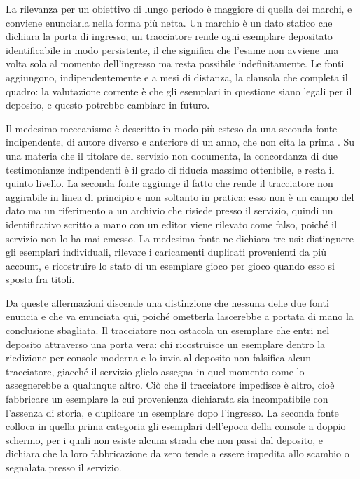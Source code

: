 La rilevanza per un obiettivo di lungo periodo è maggiore di quella dei marchi, e conviene enunciarla nella forma più netta. Un marchio è un dato statico che dichiara la porta di ingresso; un tracciatore rende ogni esemplare depositato identificabile in modo persistente, il che significa che l'esame non avviene una volta sola al momento dell'ingresso ma resta possibile indefinitamente. Le fonti aggiungono, indipendentemente e a mesi di distanza, la clausola che completa il quadro: la valutazione corrente è che gli esemplari in questione siano legali per il deposito, e questo potrebbe cambiare in futuro.

Il medesimo meccanismo è descritto in modo più esteso da una seconda fonte indipendente, di autore diverso e anteriore di un anno, che non cita la prima \cite{amiibodoctor-generazione}. Su una materia che il titolare del servizio non documenta, la concordanza di due testimonianze indipendenti è il grado di fiducia massimo ottenibile, e resta il quinto livello. La seconda fonte aggiunge il fatto che rende il tracciatore non aggirabile in linea di principio e non soltanto in pratica: esso non è un campo del dato ma un riferimento a un archivio che risiede presso il servizio, quindi un identificativo scritto a mano con un editor viene rilevato come falso, poiché il servizio non lo ha mai emesso. La medesima fonte ne dichiara tre usi: distinguere gli esemplari individuali, rilevare i caricamenti duplicati provenienti da più account, e ricostruire lo stato di un esemplare gioco per gioco quando esso si sposta fra titoli.

Da queste affermazioni discende una distinzione che nessuna delle due fonti enuncia e che va enunciata qui, poiché ometterla lascerebbe a portata di mano la conclusione sbagliata. Il tracciatore non ostacola un esemplare che entri nel deposito attraverso una porta vera: chi ricostruisce un esemplare dentro la riedizione per console moderna e lo invia al deposito non falsifica alcun tracciatore, giacché il servizio glielo assegna in quel momento come lo assegnerebbe a qualunque altro. Ciò che il tracciatore impedisce è altro, cioè fabbricare un esemplare la cui provenienza dichiarata sia incompatibile con l'assenza di storia, e duplicare un esemplare dopo l'ingresso. La seconda fonte colloca in quella prima categoria gli esemplari dell'epoca della console a doppio schermo, per i quali non esiste alcuna strada che non passi dal deposito, e dichiara che la loro fabbricazione da zero tende a essere impedita allo scambio o segnalata presso il servizio.

